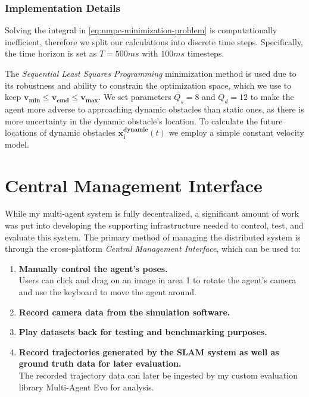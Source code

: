 \subsubsection{Implementation Details}
\label{sec:nmpc-implementation-details}
Solving the integral in \autoref{eq:nmpc-minimization-problem} is computationally inefficient, therefore we split our calculations into discrete time steps. Specifically, the time horizon is set as $T=500ms$ with $100ms$ timesteps.

The \textit{Sequential Least Squares Programming} minimization method is used due to its robustness and ability to constrain the optimization space, which we use to keep $\bm{v_{min}} \leq \bm{v_{cmd}} \leq \bm{v_{max}}$. We set parameters $Q_s = 8$ and $Q_d = 12$ to make the agent more adverse to approaching dynamic obstacles than static ones, as there is more uncertainty in the dynamic obstacle's location. To calculate the future locations of dynamic obstacles $\bm{x_i^{dynamic}}(t)$ we employ a simple constant velocity model.


\section{Central Management Interface}
\label{sec:central-management-interface}
While my multi-agent system is fully decentralized, a significant amount of work was put into developing the supporting infrastructure needed to control, test, and evaluate this system. The primary method of managing the distributed system is through the cross-platform \textit{Central Management Interface}, which can be used to: \noparskip
\smallbreak
{
    \begin{enumerate}
        \item \textbf{Manually control the agent's poses.} \\
              Users can click and drag on an image in area 1 to rotate the agent's camera and use the keyboard to move the agent around.
        \item \textbf{Record camera data from the simulation software.}
        \item \textbf{Play datasets back for testing and benchmarking purposes.}
        \item \textbf{Record trajectories generated by the SLAM system as well as ground truth data for later evaluation.} \\
              The recorded trajectory data can later be ingested by my custom evaluation library Multi-Agent Evo for analysis.
    \end{enumerate}
}

